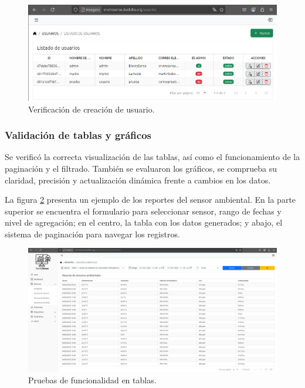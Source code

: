 \begin{figure}[H]
    \centering
    \includegraphics[width=\textwidth]{Images/44_formulario_verificacion.png}
    \caption[Verificación de creación de usuario]{Verificación de creación de usuario.}
    \label{fig:verificacion_formulario}
\end{figure}

\subsubsection{Validación de tablas y gráficos}

Se verificó la correcta visualización de las tablas, así como el funcionamiento
de la paginación y el filtrado. También se evaluaron los gráficos, se comprueba
su claridad, precisión y actualización dinámica frente a cambios en los datos.

La figura \ref{fig:tabla} presenta un ejemplo de los reportes del sensor
ambiental. En la parte superior se encuentra el formulario para seleccionar
sensor, rango de fechas y nivel de agregación; en el centro, la tabla con los
datos generados; y abajo, el sistema de paginación para navegar los registros.

\begin{figure}[H]
    \centering
    \includegraphics[width=\textwidth]{Images/45_tabla.png}
    \caption[Pruebas de funcionalidad en tablas]{Pruebas de funcionalidad en tablas.}
    \label{fig:tabla}
\end{figure}

